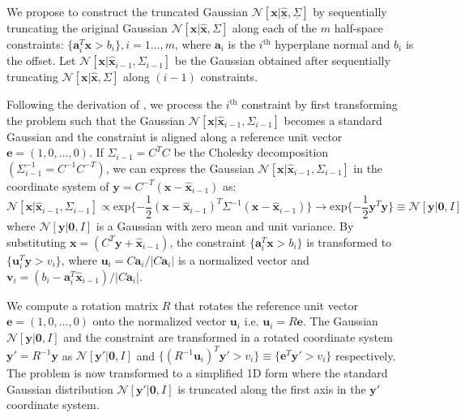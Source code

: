 \documentclass[letterpaper]{article}
\begin{document}
We propose to construct the truncated Gaussian $\mathcal{N}[\mathbf{x}|\underline{\hat{\mathbf{x}}}, \underline{\Sigma}]$ by sequentially truncating the original Gaussian $\mathcal{N}[\mathbf{x}|\hat{\mathbf{x}}, \Sigma]$ along each of the $m$ half-space constraints: $\{\mathbf{a}_{i}^T \mathbf{x} > b_{i}\}, i = 1\ldots,m$, where $\mathbf{a}_i$ is the $i^{\mathrm{th}}$ hyperplane normal and $b_i$ is the offset. Let $\mathcal{N}[\mathbf{x}|\hat{\mathbf{x}}_{i-1}, \Sigma_{i-1}]$ be the Gaussian obtained after sequentially truncating $\mathcal{N}[\mathbf{x}|\hat{\mathbf{x}}, \Sigma]$ along $(i-1)$ constraints.

Following the derivation of \cite{Toussaint09a}, we process the $i^{\mathrm{th}}$ constraint by first transforming the problem such that the Gaussian $\mathcal{N}[\mathbf{x}|\hat{\mathbf{x}}_{i-1}, \Sigma_{i-1}]$ becomes a standard Gaussian and the constraint is aligned along a reference unit vector $\mathbf{e} = (1,0,\ldots,0)$. If $\Sigma_{i-1} = C^TC$ be the Cholesky decomposition $(\Sigma_{i-1}^{-1} = C^{-1}C^{-T})$, we can express the Gaussian $\mathcal{N}[\mathbf{x}|\hat{\mathbf{x}}_{i-1}, \Sigma_{i-1}]$ in the coordinate system of $\mathbf{y} = C^{-T}(\mathbf{x} - \hat{\mathbf{x}}_{i-1})$ as:
\begin{equation*}
\mathcal{N}[\mathbf{x}|\hat{\mathbf{x}}_{i-1}, \Sigma_{i-1}] \propto \mathrm{exp}\{-\frac{1}{2}(\mathbf{x} - \hat{\mathbf{x}}_{i-1})^{T} \Sigma^{-1} (\mathbf{x} - \hat{\mathbf{x}}_{i-1})\} \longrightarrow \mathrm{exp}\{-\frac{1}{2}\mathbf{y}^T\mathbf{y}\} \equiv \mathcal{N}[\mathbf{y}|\mathbf{0},I]
\end{equation*}
where $\mathcal{N}[\mathbf{y}|\mathbf{0},I]$ is a Gaussian with zero mean and unit variance. By substituting $\mathbf{x} = (C^T\mathbf{y} + \hat{\mathbf{x}}_{i-1})$, the constraint $\{\mathbf{a}_{i}^T \mathbf{x} > b_{i}\}$ is transformed to $\{\mathbf{u}_{i}^T \mathbf{y} > v_{i}\}$, where $\mathbf{u}_i = C\mathbf{a}_i/|C\mathbf{a}_i|$ is a normalized vector and $\mathbf{v}_i = (b_i - \mathbf{a}_i^T\hat{\mathbf{x}}_{i-1})/|C\mathbf{a}_i|$.

We compute a rotation matrix $R$ that rotates the reference unit vector $\mathbf{e} = (1,0,\ldots,0)$ onto the normalized vector $\mathbf{u}_i$ i.e. $\mathbf{u}_i = R\mathbf{e}$. The Gaussian $\mathcal{N}[\mathbf{y}|\mathbf{0},I]$ and the constraint are transformed in a rotated coordinate system $\mathbf{y}' = R^{-1}\mathbf{y}$ as $\mathcal{N}[\mathbf{y'}|\mathbf{0},I]$ and $\{(R^{-1}\mathbf{u}_i)^T\mathbf{y'} > v_{i}\} \equiv \{\mathbf{e}^T\mathbf{y'} > v_{i}\}$ respectively. The problem is now transformed to a simplified 1D form where the standard Gaussian distribution $\mathcal{N}[\mathbf{y'}|\mathbf{0},I]$ is truncated along the first axis in the $\mathbf{y}'$ coordinate system.
\end{document}
